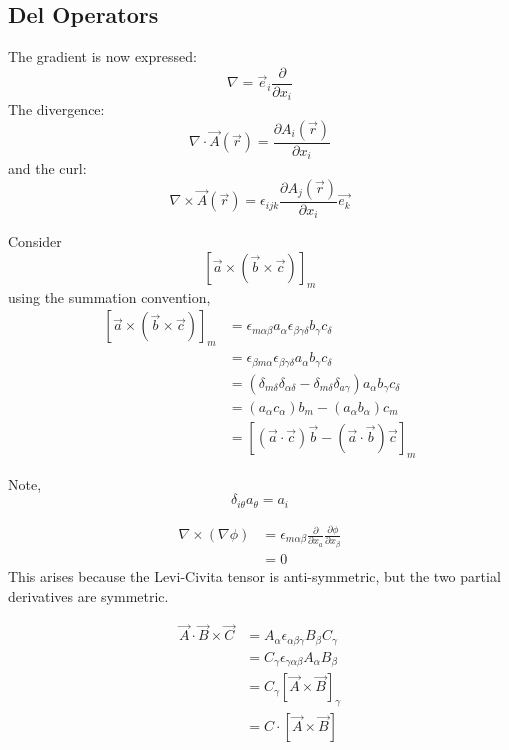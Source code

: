 \subsection{Del Operators}
\label{sec:deloperators}
The gradient is now expressed:
\begin{equation}
  \label{eq:grad}
  \nabla = \vec e_i \frac{\partial }{\partial x_i}
\end{equation}
The divergence:
\begin{equation}
  \label{eq:divergence}
  \nabla \cdot \vec{A}(\vec{r}) = \frac{\partial A_i(\vec{r})}{\partial x_i}
\end{equation}
and the curl:
\begin{equation}
  \label{eq:curl}
  \nabla \times \vec{A}(\vec{r}) = \epsilon_{ijk} \frac{\partial A_j(\vec{r})}{\partial x_i} \vec{e_k}
\end{equation}
\begin{example}
  Consider
  \[ \left[ \vec{a} \times ( \vec{b} \times \vec{c} ) \right]_m \]
  using the summation convention,
  \begin{align*} \left[ \vec{a} \times ( \vec{b} \times \vec{c} )
    \right]_m
    &= \epsilon_{m \alpha \beta} a_{\alpha} \epsilon_{\beta \gamma \delta} b_{\gamma} c_{\delta} \\
    &= \epsilon_{\beta m \alpha} \epsilon_{\beta \gamma \delta} a_{\alpha} b_{\gamma} c_{\delta} \\
    &= (\delta_{m \delta}\delta_{\alpha \delta} - \delta_{m \delta} \delta_{a \gamma}) a_{\alpha} b_{\gamma} c_{\delta}\\
    &=  (a_{\alpha}c_{\alpha}) b_m - (a_{\alpha}b_{\alpha}) c_m \\
    &= \left[ (\vec a \cdot \vec c) \vec b - (\vec a \cdot \vec b)
      \vec c \right]_{m}
  \end{align*}
\end{example}
Note, \[ \delta_{i\theta} a_{\theta} = a_i \]
\begin{example}
  \begin{align*}
    \nabla \times ( \nabla \phi ) &= \epsilon_{m\alpha \beta} \frac{\partial }{\partial x_a} \frac{\partial \phi}{\partial x_{\beta}}\\
    &= 0
  \end{align*}
  This arises because the Levi-Civita tensor is anti-symmetric, but
  the two partial derivatives are symmetric.
\end{example}
\begin{example}
  \begin{align*}
    \vec A \cdot \vec B \times \vec C &= A_{\alpha}\epsilon_{\alpha \beta \gamma} B_{\beta} C_{\gamma} \\
    &= C_{\gamma} \epsilon_{\gamma \alpha \beta} A_{\alpha} B_{\beta} \\
    &= C_{\gamma} [\vec A \times \vec B]_{\gamma} \\
    &= C \cdot [ \vec A \times \vec B]
  \end{align*}
\end{example}

